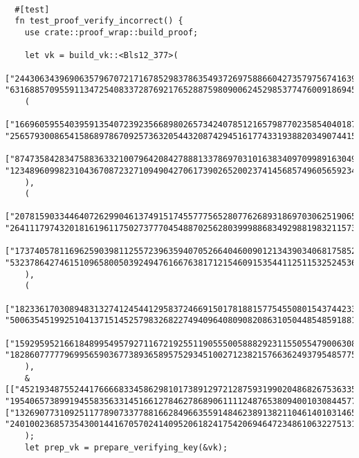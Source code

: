 \documentclass{article}
\begin{document}
\begin{lstlisting}
  
  #[test]
  fn test_proof_verify_incorrect() {
    use crate::proof_wrap::build_proof;

    let vk = build_vk::<Bls12_377>(
    ["244306343969063579670721716785298378635493726975886604273579756741639953229415532528173059841495385161051909109889", "63168857095591134725408337287692176528875980900624529853774760091869452188562350014800651918572654790783920028544"],
    (
    ["166960595540395913540723923566898026573424078512165798770235854040187289225192916010951416820805112564604857674759", "256579300865415868978670925736320544320874294516177433193882034907441551828751116120797786447763257652992433074246"],
    ["87473584283475883633210079642084278881337869703101638340970998916304987007252265651123549659939971414867340710413", "123489609982310436708723271094904270617390265200237414568574960565923435716212526049371801011721780033997716837207"],
    ),
    (
    ["207815903344640726299046137491517455777565280776268931869703062519065330398931946294820126450478727867816749575328", "26411179743201816196117502737770454887025628039998868349298819832115736570578946577905207881058063637557577233081"],
    ["173740578116962590398112557239635940705266404600901213439034068175852581397457477553437876533246152293969399185346", "53237864274615109658005039249476166763817121546091535441125115325245366998581238918446431741630833736330879409260"],
    ),
    (
    ["182336170308948313274124544129583724669150178188157754550801543744233234403657037451296838109344679861568207613367", "50063545199251041371514525798326822749409640809082086310504485485918817418911777413389911727510843283856035409701"],
    ["159295952166184899549579271167219255119055500588829231155055479006308616522384365458479858992918918801397710916187", "182860777779699565903677389365895752934510027123821576636249379548577596319261062512490971767063470277595543086883"]
    ),
    &[["45219348755244176666833458629810173891297212875931990204868267536335133459926383707224440114114434942676491459498", "19540657389919455835633145166127846278689061111248765380940010308445770554757443738413976319711696645309607631162"], ["132690773109251177890733778816628496635591484623891382110461401031465056699668313488237840261951485844724629886749", "240100236857354300144167057024140952061824175420694647234861063227513152232079560535186470882088794992850790083762"]],
    );
    let prep_vk = prepare_verifying_key(&vk);


\end{lstlisting}
\end{document}
